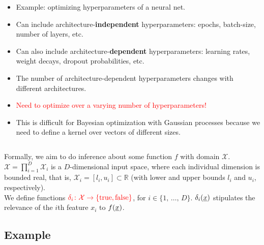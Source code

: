 \documentclass[landscape,a0b,final,a4resizeable]{include/a0poster}
\newcommand{\vect}[1]{\underline{\smash{#1}}}
\renewcommand{\v}[1]{\vect{#1}}
\newcommand{\reals}{\mathds{R}}
\newcommand{\sX}{\mathcal{X}}
\begin{document}
\begin{poster}
\begin{multicols}{3}
\begin{minipage}[c]{0.64\columnwidth}
\begin{itemize}
	\item Example: optimizing hyperparameters of a neural net.
	\item Can include architecture-\textbf{independent} hyperparameters: epochs, batch-size, number of layers, etc.
	\item Can also include architecture-\textbf{dependent} hyperparameters: learning rates, weight decays, dropout probabilities, etc.
	\item The number of architecture-dependent hyperparameters changes with different architectures.
	\item \textcolor{red} {Need to optimize over a varying number of hyperparameters!}
	\item This is difficult for Bayesian optimization with Gaussian processes because we need to define a kernel over vectors of different sizes.
\end{itemize}
\end{minipage}
\begin{minipage}[c]{0.35\columnwidth}
\begin{centering}
\begin{tabular}{c}
 \\
\end{tabular}
\end{centering}
\end{minipage}

\vspace{0.5in}

Formally, we aim to do inference about some function $f$ with domain 
 $\sX$. $\sX = \prod_{i=1}^D \sX_i$ is a $D$-dimensional input space, where each individual dimension is bounded real, that is, $\sX_i = [l_i, u_i] \subset \reals$ (with lower and upper bounds $l_i$ and $u_i$, respectively).\\
We define functions $\textcolor{red}{\delta_i\colon \sX\to \{\text{true}, \text{false}\}}$, for $i \in \{1,\,\ldots,\,D\}$. $\delta_i(\v{x})$ stipulates the relevance of the $i$th feature $x_i$ to 
  $f(\v{x})$.



\subsection*{Example}
\vspace{-0.05in}


\end{multicols}
\end{poster}
\end{document}
